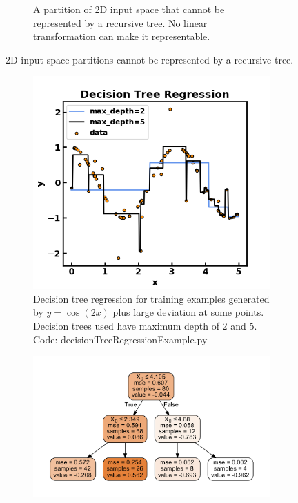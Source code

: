 \begin{refsection}
\begin{figure}[H]
\begin{subfigure}[b]{0.45\textwidth}
		\caption{A partition of 2D input space that cannot be represented by a recursive tree. No linear transformation can make it representable.}
		\label{fig:2DInputSpacePartitionRecursiveTreeFailure}
	\end{subfigure}
	\caption{2D input space partitions cannot be represented by a recursive tree.}
\end{figure}


\begin{figure}[H]
	\centering
\begin{subfigure}[t]{0.45\textwidth}
	\centering
	\includegraphics[width=1\linewidth]{../figures/statisticalLearning/treeMethods/decisionTreeRegressionExample}
	\caption{Decision tree regression for training examples generated by $y = \cos(2x)$ plus large deviation at some points. Decision trees used have maximum depth of 2 and 5. Code: decisionTreeRegressionExample.py}
\end{subfigure}\quad
	\begin{subfigure}[t]{0.45\textwidth}
	\centering
	\includegraphics[width=1\linewidth]{../figures/statisticalLearning/treeMethods/RegressionTree_maxdepth2}

\end{subfigure}
\end{figure}
\end{refsection}
